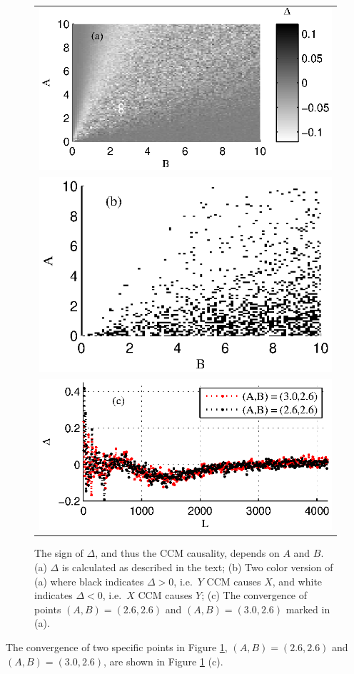 \documentclass[twocolumn,aps,pre,groupedaddress]{revtex4-1}
\begin{document}
\begin{figure}[ht]
\begin{tabular}{l}
\includegraphics[scale=0.8]{LinearEx.eps} \\
\includegraphics[scale=0.8]{LinearEx3Color.eps} \\
\includegraphics[scale=0.8]{LinearExChangeL.eps} \\
\end{tabular}
\caption{The sign of $\Delta$, and thus the CCM causality, depends on $A$ and $B$. (a) $\Delta$ is calculated as described in the text; (b) Two color version of (a) where black indicates $\Delta>0$, i.e.\ $Y$ CCM causes $X$, and white indicates $\Delta<0$, i.e.\ $X$ CCM causes $Y$; (c) The convergence of points $(A,B) = (2.6,2.6)$ and $(A,B)=(3.0,2.6)$ marked in (a).}
\label{fig:linearex1}
\end{figure}
The convergence of two specific points in Figure \ref{fig:linearex1}, $(A,B) = (2.6,2.6)$ and $(A,B)=(3.0,2.6)$, are shown in Figure \ref{fig:linearex1} (c).
\end{document}

